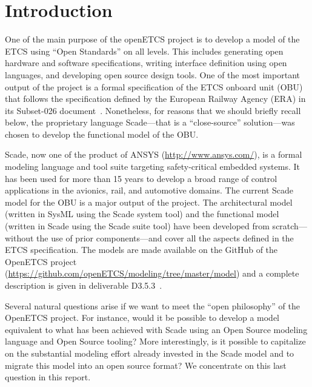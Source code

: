 \documentclass{template/openetcs_report}
\begin{document}

\mainmatter


\chapter{Introduction}

One of the main purpose of the openETCS project is to develop a model
of the ETCS using ``Open Standards'' on all levels. This includes
generating open hardware and software specifications, writing
interface definition using open languages, and developing open source
design tools. One of the most important output of the project is a
formal specification of the ETCS onboard unit (OBU) that follows the
specification defined by the European Railway Agency (ERA) in its
Subset-026 document~\cite{subset-026}. Nonetheless, for reasons that
we should briefly recall below, the proprietary language Scade---that
is a ``close-source'' solution---was chosen to develop the functional
model of the OBU.

Scade, now one of the product of ANSYS (\url{http://www.ansys.com/}),
is a formal modeling language and tool suite targeting safety-critical
embedded systems. It has been used for more than 15 years to develop a
broad range of control applications in the avionics, rail, and
automotive domains. The current Scade model for the OBU is a major
output of the project. The architectural model (written in SysML using
the Scade system tool) and the functional model (written in Scade
using the Scade suite tool) have been developed from scratch---without
the use of prior components---and cover all the aspects defined in the
ETCS specification. The models are made available on the GitHub of the
OpenETCS project
(\url{https://github.com/openETCS/modeling/tree/master/model}) and a
complete description is given in deliverable D3.5.3~\cite{d353}.

Several natural questions arise if we want to meet the ``open
philosophy'' of the OpenETCS project. For instance, would it be
possible to develop a model equivalent to what has been achieved with
Scade using an Open Source modeling language and Open Source tooling?
More interestingly, is it possible to capitalize on the substantial
modeling effort already invested in the Scade model and to migrate
this model into an open source format?  We concentrate on this last
question in this report.
\end{document}
